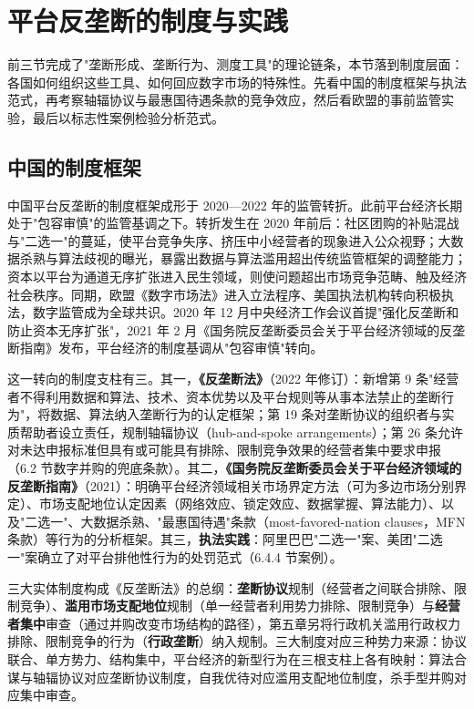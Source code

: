 \section{平台反垄断的制度与实践}

前三节完成了"垄断形成、垄断行为、测度工具"的理论链条，本节落到制度层面：各国如何组织这些工具、如何回应数字市场的特殊性。先看中国的制度框架与执法范式，再考察轴辐协议与最惠国待遇条款的竞争效应，然后看欧盟的事前监管实验，最后以标志性案例检验分析范式。

\subsection{中国的制度框架}

中国平台反垄断的制度框架成形于 2020—2022 年的监管转折。此前平台经济长期处于"包容审慎"的监管基调之下。转折发生在 2020 年前后：社区团购的补贴混战与"二选一"的蔓延，使平台竞争失序、挤压中小经营者的现象进入公众视野；大数据杀熟与算法歧视的曝光，暴露出数据与算法滥用超出传统监管框架的调整能力；资本以平台为通道无序扩张进入民生领域，则使问题超出市场竞争范畴、触及经济社会秩序。同期，欧盟《数字市场法》进入立法程序、美国执法机构转向积极执法，数字监管成为全球共识。2020 年 12 月中央经济工作会议首提"强化反垄断和防止资本无序扩张"，2021 年 2 月《国务院反垄断委员会关于平台经济领域的反垄断指南》发布，平台经济的制度基调从"包容审慎"转向。

这一转向的制度支柱有三。其一，\textbf{《反垄断法》}（2022 年修订）：新增第 9 条"经营者不得利用数据和算法、技术、资本优势以及平台规则等从事本法禁止的垄断行为"，将数据、算法纳入垄断行为的认定框架；第 19 条对垄断协议的组织者与实质帮助者设立责任，规制轴辐协议（hub-and-spoke arrangements）；第 26 条允许对未达申报标准但具有或可能具有排除、限制竞争效果的经营者集中要求申报（6.2 节数字并购的兜底条款）。其二，\textbf{《国务院反垄断委员会关于平台经济领域的反垄断指南》}（2021）：明确平台经济领域相关市场界定方法（可为多边市场分别界定）、市场支配地位认定因素（网络效应、锁定效应、数据掌握、算法能力）、以及"二选一"、大数据杀熟、"最惠国待遇"条款（most-favored-nation clauses，MFN 条款）等行为的分析框架。其三，\textbf{执法实践}：阿里巴巴"二选一"案、美团"二选一"案确立了对平台排他性行为的处罚范式（6.4.4 节案例）。

三大实体制度构成《反垄断法》的总纲：\textbf{垄断协议}规制（经营者之间联合排除、限制竞争）、\textbf{滥用市场支配地位}规制（单一经营者利用势力排除、限制竞争）与\textbf{经营者集中}审查（通过并购改变市场结构的路径），第五章另将行政机关滥用行政权力排除、限制竞争的行为（\textbf{行政垄断}）纳入规制。三大制度对应三种势力来源：协议联合、单方势力、结构集中，平台经济的新型行为在三根支柱上各有映射：算法合谋与轴辐协议对应垄断协议制度，自我优待对应滥用支配地位制度，杀手型并购对应集中审查。

